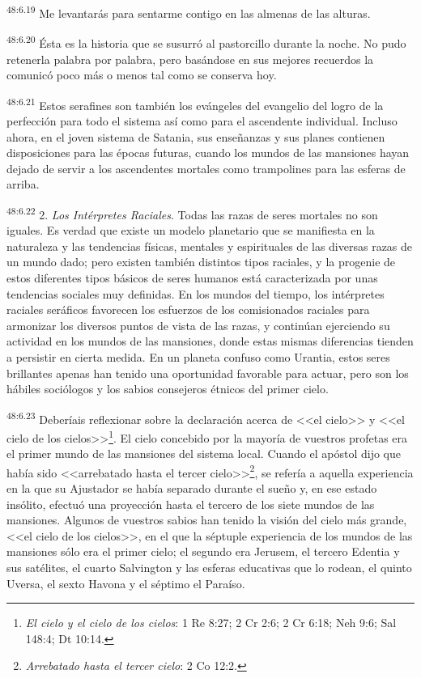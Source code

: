 \par
\textsuperscript{48:6.19} Me levantarás para sentarme contigo en las almenas de las alturas.

\par
\textsuperscript{48:6.20} Ésta es la historia que se susurró al pastorcillo durante la noche. No pudo retenerla palabra por palabra, pero basándose en sus mejores recuerdos la comunicó poco más o menos tal como se conserva hoy.

\par
\textsuperscript{48:6.21} Estos serafines son también los evángeles del evangelio del logro de la perfección para todo el sistema así como para el ascendente individual. Incluso ahora, en el joven sistema de Satania, sus enseñanzas y sus planes contienen disposiciones para las épocas futuras, cuando los mundos de las mansiones hayan dejado de servir a los ascendentes mortales como trampolines para las esferas de arriba.

\par
\textsuperscript{48:6.22} 2. \textit{Los Intérpretes Raciales}. Todas las razas de seres mortales no son iguales. Es verdad que existe un modelo planetario que se manifiesta en la naturaleza y las tendencias físicas, mentales y espirituales de las diversas razas de un mundo dado; pero existen también distintos tipos raciales, y la progenie de estos diferentes tipos básicos de seres humanos está caracterizada por unas tendencias sociales muy definidas. En los mundos del tiempo, los intérpretes raciales seráficos favorecen los esfuerzos de los comisionados raciales para armonizar los diversos puntos de vista de las razas, y continúan ejerciendo su actividad en los mundos de las mansiones, donde estas mismas diferencias tienden a persistir en cierta medida. En un planeta confuso como Urantia, estos seres brillantes apenas han tenido una oportunidad favorable para actuar, pero son los hábiles sociólogos y los sabios consejeros étnicos del primer cielo.

\par
\textsuperscript{48:6.23} Deberíais reflexionar sobre la declaración acerca de <<el cielo>> y <<el cielo de los cielos>>\footnote{\textit{El cielo y el cielo de los cielos}: 1 Re 8:27; 2 Cr 2:6; 2 Cr 6:18; Neh 9:6; Sal 148:4; Dt 10:14.}. El cielo concebido por la mayoría de vuestros profetas era el primer mundo de las mansiones del sistema local. Cuando el apóstol dijo que había sido <<arrebatado hasta el tercer cielo>>\footnote{\textit{Arrebatado hasta el tercer cielo}: 2 Co 12:2.}, se refería a aquella experiencia en la que su Ajustador se había separado durante el sueño y, en ese estado insólito, efectuó una proyección hasta el tercero de los siete mundos de las mansiones. Algunos de vuestros sabios han tenido la visión del cielo más grande, <<el cielo de los cielos>>, en el que la séptuple experiencia de los mundos de las mansiones sólo era el primer cielo; el segundo era Jerusem, el tercero Edentia y sus satélites, el cuarto Salvington y las esferas educativas que lo rodean, el quinto Uversa, el sexto Havona y el séptimo el Paraíso.

